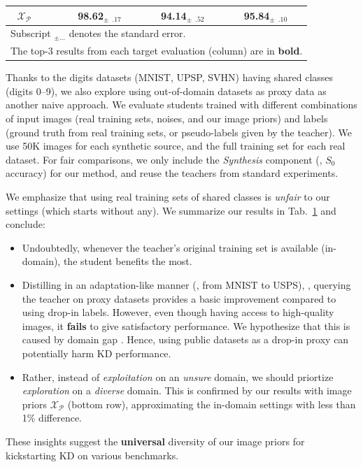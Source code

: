 \begin{table}[ht]
\begin{tabular}{c|c|c|c|c}
               $\mathcal{X}_\mathcal{P}$ &              & \textbf{98.62}$_{\pm  \phantom{0}.17}$ & \textbf{94.14}$_{\pm \phantom{0}.52}$ & \textbf{95.84}$_{\pm \phantom{0}.10}$ \\
        \hline
        \multicolumn{5}{l}{Subscript $_{\pm \ldots}$ denotes the standard error.} \\
        \multicolumn{5}{l}{The top-3 results from each target evaluation (column) are in \textbf{bold}.} \\
    \end{tabular}
    \label{tab:abla-naive-approaches}
\end{table}

\begin{foldable} %
    Thanks to the digits datasets (MNIST, UPSP, SVHN) having shared classes (digits 0--9), we also explore using out-of-domain datasets as proxy data as another naive approach.
    We evaluate students trained with different combinations of input images (real training sets, noises, and our image priors) and labels (ground truth from real training sets, or pseudo-labels given by the teacher).
    We use 50K images for each synthetic source, and the full training set for each real dataset.
    For fair comparisons, we only include the \textit{Synthesis} component (\ie, $S_{0}$ accuracy) for our method, and reuse the teachers from standard experiments.

\end{foldable}

\begin{foldable} %
    We emphasize that using real training sets of shared classes is \textit{unfair} to our settings (which starts without any).
    We summarize our results in Tab.~\ref{tab:abla-naive-approaches} and conclude: 
    \begin{itemize}
        \item Undoubtedly, whenever the teacher's original training set is available (in-domain), the student benefits the most.
        \item Distilling in an adaptation-like manner (\eg, from MNIST to USPS), \ie, querying the teacher on proxy datasets provides a basic improvement compared to using drop-in labels.
            However, even though having access to high-quality images, it \textbf{fails} to give satisfactory performance.
            We hypothesize that this is caused by domain gap \cite{ben2010theory}.
            Hence, using public datasets as a drop-in proxy can potentially harm KD performance.
        \item Rather, instead of \textit{exploitation} on an \textit{unsure} domain, we should priortize \textit{exploration} on a \textit{diverse} domain.
            This is confirmed by our results with image priors $\mathcal{X}_\mathcal{P}$ (bottom row), approximating the in-domain settings with less than 1\% difference.
    \end{itemize}
    These insights suggest the \textbf{universal} diversity of our image priors for kickstarting KD on various benchmarks.
\end{foldable}


